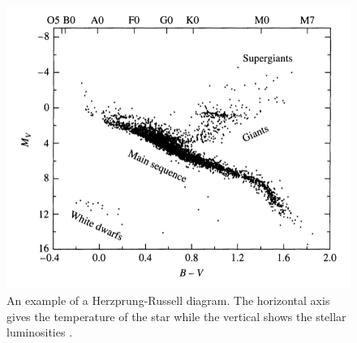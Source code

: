\begin{figure}
\centering
\includegraphics[width=\linewidth]{figures/hrDiagram.png}
\caption{An example of a Herzprung-Russell diagram. The horizontal axis gives the temperature of the star while the vertical shows the stellar luminosities \cite{CarrollOstlieBook}.}
\label{fig: HR_diagram}
\end{figure}

